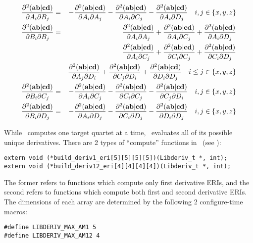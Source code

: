 \documentclass[12pt]{article}
\begin{document}
\begin{eqnarray} \label{eqn:TId2eri_AB}
\frac{\partial^2 ({\bf ab}|{\bf cd})}{\partial A_i \partial B_j} & = & - \frac{\partial^2 ({\bf ab}|{\bf cd})}{\partial A_i \partial A_j} -
\frac{\partial^2 ({\bf ab}|{\bf cd})}{\partial A_i \partial C_j} - \frac{\partial^2 ({\bf ab}|{\bf cd})}{\partial A_i \partial D_j} \quad i,j \in \{x,y,z\} \\
\label{eqn:TId2eri_BB}
\frac{\partial^2 ({\bf ab}|{\bf cd})}{\partial B_i \partial B_j} & = & \frac{\partial^2 ({\bf ab}|{\bf cd})}{\partial A_i \partial A_j} +
\frac{\partial^2 ({\bf ab}|{\bf cd})}{\partial A_i \partial C_j} + \frac{\partial^2 ({\bf ab}|{\bf cd})}{\partial A_i \partial D_j} \nonumber \\
& & \frac{\partial^2 ({\bf ab}|{\bf cd})}{\partial A_i \partial C_j} +
\frac{\partial^2 ({\bf ab}|{\bf cd})}{\partial C_i \partial C_j} + \frac{\partial^2 ({\bf ab}|{\bf cd})}{\partial C_i \partial D_j} \nonumber \\
& & \frac{\partial^2 ({\bf ab}|{\bf cd})}{\partial A_j \partial D_i} +
\frac{\partial^2 ({\bf ab}|{\bf cd})}{\partial C_j \partial D_i} + \frac{\partial^2 ({\bf ab}|{\bf cd})}{\partial D_i \partial D_j} \quad i \leq j \in \{x,y,z\} \\
\label{eqn:TId2eri_BC}
\frac{\partial^2 ({\bf ab}|{\bf cd})}{\partial B_i \partial C_j} & = & - \frac{\partial^2 ({\bf ab}|{\bf cd})}{\partial A_i \partial C_j} -
\frac{\partial^2 ({\bf ab}|{\bf cd})}{\partial C_i \partial C_j} - \frac{\partial^2 ({\bf ab}|{\bf cd})}{\partial C_j \partial D_i} \quad i,j \in \{x,y,z\} \\
\label{eqn:TId2eri_BD}
\frac{\partial^2 ({\bf ab}|{\bf cd})}{\partial B_i \partial D_j} & = & - \frac{\partial^2 ({\bf ab}|{\bf cd})}{\partial A_i \partial D_j} -
\frac{\partial^2 ({\bf ab}|{\bf cd})}{\partial C_i \partial D_j} - \frac{\partial^2 ({\bf ab}|{\bf cd})}{\partial D_i \partial D_j} \quad i,j \in \{x,y,z\} \\
\end{eqnarray}

While \libint\ computes one target quartet at a time, \libderiv\ evaluates all
of its possible unique derivatives. There are 2 types of ``compute'' functions in \libderiv\ (see \libderivh):
\begin{verbatim}
extern void (*build_deriv1_eri[5][5][5][5])(Libderiv_t *, int);
extern void (*build_deriv12_eri[4][4][4][4])(Libderiv_t *, int);
\end{verbatim}
The former refers to functions which compute only first derivative ERIs, and the second
refers to functions which compute both first and second derivative ERIs.
The dimensions of each array are determined by the following 2 configure-time macros:
\begin{verbatim}
#define LIBDERIV_MAX_AM1 5
#define LIBDERIV_MAX_AM12 4
\end{verbatim}
\end{document}
